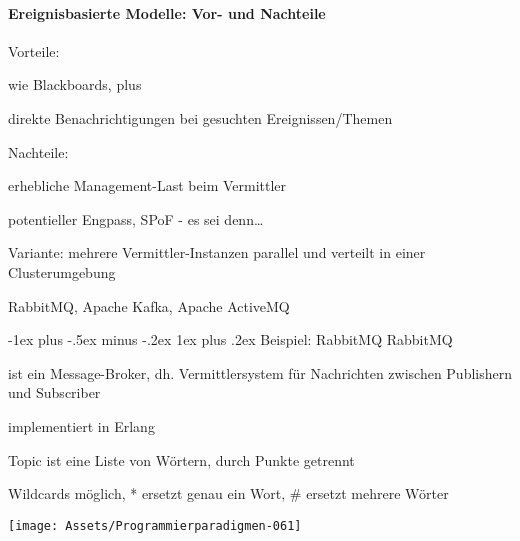 \documentclass[10pt]{article}
\makeatletter
\renewcommand{\subsubsection}{\@startsection{subsubsection}{3}{0mm}%
                                {-1ex plus -.5ex minus -.2ex}%
                                {1ex plus .2ex}%
                                {\normalfont\small\bfseries}}
\makeatother
\begin{document}
\paragraph{Ereignisbasierte Modelle: Vor- und Nachteile}
\begin{itemize*}
  \item Vorteile:
  \begin{itemize*}
    \item wie Blackboards, plus
    \item direkte Benachrichtigungen bei gesuchten Ereignissen/Themen
  \end{itemize*}
  \item Nachteile:
  \begin{itemize*}
    \item erhebliche Management-Last beim Vermittler
    \begin{itemize*}
      \item potentieller Engpass, SPoF - es sei denn…
    \end{itemize*}
  \end{itemize*}
  Variante: mehrere Vermittler-Instanzen parallel und verteilt in einer Clusterumgebung
  \begin{itemize*}
    \item RabbitMQ, Apache Kafka, Apache ActiveMQ
  \end{itemize*}
\end{itemize*}

\subsubsection{Beispiel: RabbitMQ}
RabbitMQ
\begin{itemize*}
  \item ist ein Message-Broker, dh. Vermittlersystem für Nachrichten zwischen Publishern und Subscriber
  \item implementiert in Erlang
  \begin{itemize*}
    \item Topic ist eine Liste von Wörtern, durch Punkte getrennt
    \item Wildcards möglich, * ersetzt genau ein Wort, \# ersetzt mehrere Wörter
  \end{itemize*}
\end{itemize*}
\begin{center}
  \centering
  \texttt{[image: Assets/Programmierparadigmen-061]}
\end{center}
\end{document}
